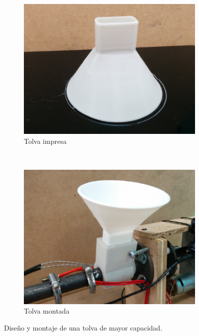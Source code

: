 \begin{figure}[H]
    \centering
    \begin{subfigure}[b]{0.5\textwidth}
        \centering
        \includegraphics[width=\linewidth]{images/producciones/20072015/IMG_20150721_121831.jpg}
        \caption{Tolva impresa}
        \label{fig:tolva-impresa}
    \end{subfigure}
    ~
    \begin{subfigure}[b]{0.5\textwidth}
            \centering
        \includegraphics[width=\linewidth]{images/producciones/20072015/IMG_20150721_121904.jpg}
        \caption{Tolva montada}
        \label{fig:tolva-montada}
    \end{subfigure}
    \caption{Diseño y montaje de una tolva de mayor capacidad.}
    \label{fig:tolv_montaj}
\end{figure}


